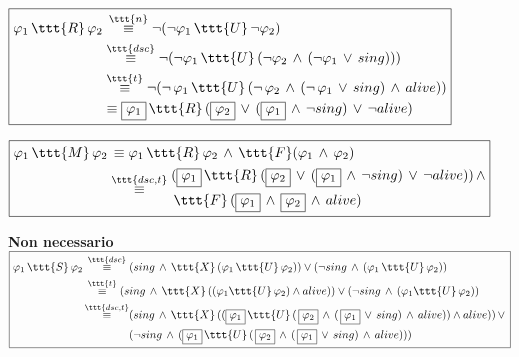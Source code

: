 \documentclass[11pt]{article}
\begin{document}
\vspace{0.25cm}

$\boxed{\begin{aligned}
            \varphi_1\,\ttt{R}\,\varphi_2 &\,\overset{\ttt{n}}{\equiv} \neg(\neg\varphi_1\,\ttt{U}\,\neg\varphi_2) \\
            &\overset{\ttt{dsc}}{\equiv} \neg(\neg\varphi_1\,\ttt{U}\,(\neg\varphi_2\,\land\,(\neg\varphi_1\,\lor\,sing)))\\
            &\overset{\ttt{t}}{\equiv} \neg(\neg\,\varphi_1\,\ttt{U}\,(\neg\,\varphi_2\,\land\,(\neg\,\varphi_1\,\lor\,sing)\,\land\,alive))\\
            &\equiv \boxed{\varphi_1}\,\ttt{R}\,(\boxed{\varphi_2}\,\lor\,(\boxed{\varphi_1}\,\land\,\neg sing)\,\lor\,\neg alive)
\end{aligned}}$

\vspace{0.25cm}

$\boxed{\begin{aligned}
      \varphi_1\,\ttt{M}\,\varphi_2 &\,\equiv \varphi_1\,\ttt{R}\,\varphi_2\,\land\,\ttt{F}(\varphi_1\,\land\,\varphi_2) \\
      &\overset{\ttt{dsc,t}}{\equiv} \begin{aligned}
                                     &(\boxed{\varphi_1}\,\ttt{R}\,(\boxed{\varphi_2}\,\lor\,(\boxed{\varphi_1}\,\land\,\neg sing)\,\lor\,\neg alive))\,\land\\
                                     &\,\ttt{F}\,(\boxed{\varphi_1}\,\land\,\boxed{\varphi_2}\,\land\,alive)
      \end{aligned}
\end{aligned}}$

\vspace{1.5cm}

\textbf{Non necessario}\\
\vspace{0.15cm}
$\boxed{\begin{aligned}
      \varphi_1\,\ttt{S}\,\varphi_2 \,&\overset{\ttt{dsc}}{\equiv} (sing\,\land\,\ttt{X}\,(\varphi_1\,\ttt{U}\,\varphi_2)) \lor (\neg sing\,\land\,(\varphi_1\,\ttt{U}\,\varphi_2))\\
      &\overset{\ttt{t}}{\equiv} (sing\,\land\,\ttt{X}\,((\varphi_1\ttt{U}\,\varphi_2) \land alive)) \lor (\neg sing\,\land\,(\varphi_1\ttt{U}\,\varphi_2))\\
      &\begin{aligned}\overset{\ttt{dsc,t}}{\equiv}&(sing\,\land\,\ttt{X}\,((\boxed{\varphi_1}\,\ttt{U}\,(\,\boxed{\varphi_2}\,\land\,(\,\boxed{\varphi_1}\,\lor\,sing)\,\land\,alive)) \land alive))\,\lor\, \\
      &(\neg sing\,\land\,(\boxed{\varphi_1}\,\ttt{U}\,(\,\boxed{\varphi_2}\,\land\,(\,\boxed{\varphi_1}\,\lor\,sing)\,\land\,alive)))\end{aligned}
\end{aligned}}$
\end{document}
